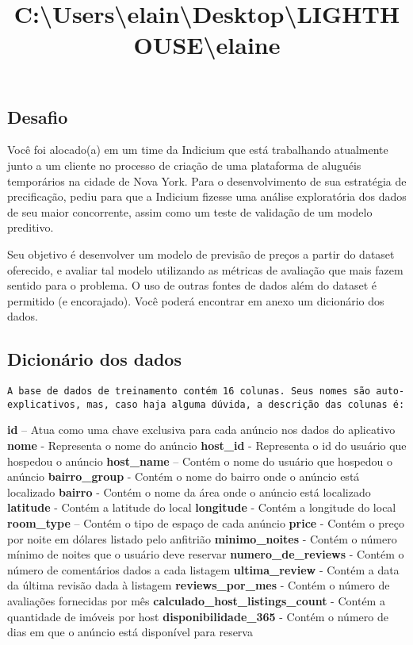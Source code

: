 \documentclass[11pt]{article}
\title{C:\textbackslash{}Users\textbackslash{}elain\textbackslash{}Desktop\textbackslash{}LIGHTHOUSE\textbackslash{}elaine}
\begin{document}
    
    \maketitle
    
    

    
    \hypertarget{desafio}{%
\subsection{Desafio}\label{desafio}}

Você foi alocado(a) em um time da Indicium que está trabalhando
atualmente junto a um cliente no processo de criação de uma plataforma
de aluguéis temporários na cidade de Nova York. Para o desenvolvimento
de sua estratégia de precificação, pediu para que a Indicium fizesse uma
análise exploratória dos dados de seu maior concorrente, assim como um
teste de validação de um modelo preditivo.

Seu objetivo é desenvolver um modelo de previsão de preços a partir do
dataset oferecido, e avaliar tal modelo utilizando as métricas de
avaliação que mais fazem sentido para o problema. O uso de outras fontes
de dados além do dataset é permitido (e encorajado). Você poderá
encontrar em anexo um dicionário dos dados.

    \hypertarget{dicionuxe1rio-dos-dados}{%
\subsection{Dicionário dos dados}\label{dicionuxe1rio-dos-dados}}

\begin{verbatim}
A base de dados de treinamento contém 16 colunas. Seus nomes são auto-explicativos, mas, caso haja alguma dúvida, a descrição das colunas é:
\end{verbatim}

\textbf{id} -- Atua como uma chave exclusiva para cada anúncio nos dados
do aplicativo \textbf{nome} - Representa o nome do anúncio
\textbf{host\_id} - Representa o id do usuário que hospedou o anúncio
\textbf{host\_name} -- Contém o nome do usuário que hospedou o anúncio
\textbf{bairro\_group} - Contém o nome do bairro onde o anúncio está
localizado \textbf{bairro} - Contém o nome da área onde o anúncio está
localizado \textbf{latitude} - Contém a latitude do local
\textbf{longitude} - Contém a longitude do local \textbf{room\_type} --
Contém o tipo de espaço de cada anúncio \textbf{price} - Contém o preço
por noite em dólares listado pelo anfitrião \textbf{minimo\_noites} -
Contém o número mínimo de noites que o usuário deve reservar
\textbf{numero\_de\_reviews} - Contém o número de comentários dados a
cada listagem \textbf{ultima\_review} - Contém a data da última revisão
dada à listagem \textbf{reviews\_por\_mes} - Contém o número de
avaliações fornecidas por mês \textbf{calculado\_host\_listings\_count}
- Contém a quantidade de imóveis por host \textbf{disponibilidade\_365}
- Contém o número de dias em que o anúncio está disponível para reserva
\end{document}
